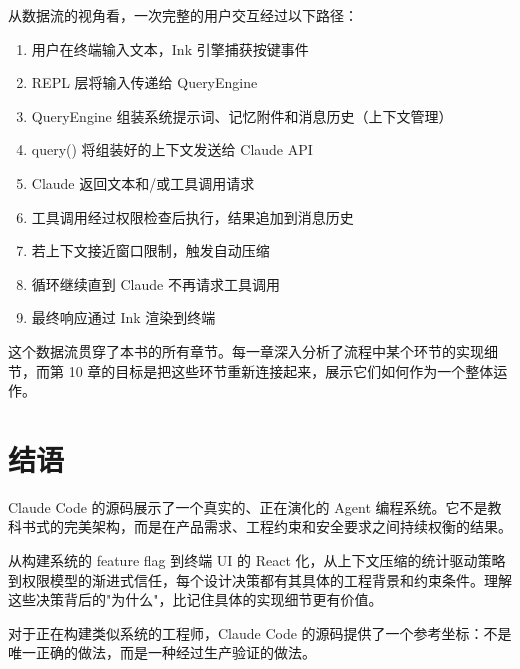 从数据流的视角看，一次完整的用户交互经过以下路径：

\begin{enumerate}
  \item 用户在终端输入文本，Ink 引擎捕获按键事件
  \item REPL 层将输入传递给 QueryEngine
  \item QueryEngine 组装系统提示词、记忆附件和消息历史（上下文管理）
  \item query() 将组装好的上下文发送给 Claude API
  \item Claude 返回文本和/或工具调用请求
  \item 工具调用经过权限检查后执行，结果追加到消息历史
  \item 若上下文接近窗口限制，触发自动压缩
  \item 循环继续直到 Claude 不再请求工具调用
  \item 最终响应通过 Ink 渲染到终端
\end{enumerate}

这个数据流贯穿了本书的所有章节。每一章深入分析了流程中某个环节的实现细节，而第 10 章的目标是把这些环节重新连接起来，展示它们如何作为一个整体运作。

\section{结语}

Claude Code 的源码展示了一个真实的、正在演化的 Agent 编程系统。它不是教科书式的完美架构，而是在产品需求、工程约束和安全要求之间持续权衡的结果。

从构建系统的 feature flag 到终端 UI 的 React 化，从上下文压缩的统计驱动策略到权限模型的渐进式信任，每个设计决策都有其具体的工程背景和约束条件。理解这些决策背后的"为什么"，比记住具体的实现细节更有价值。

对于正在构建类似系统的工程师，Claude Code 的源码提供了一个参考坐标：不是唯一正确的做法，而是一种经过生产验证的做法。
